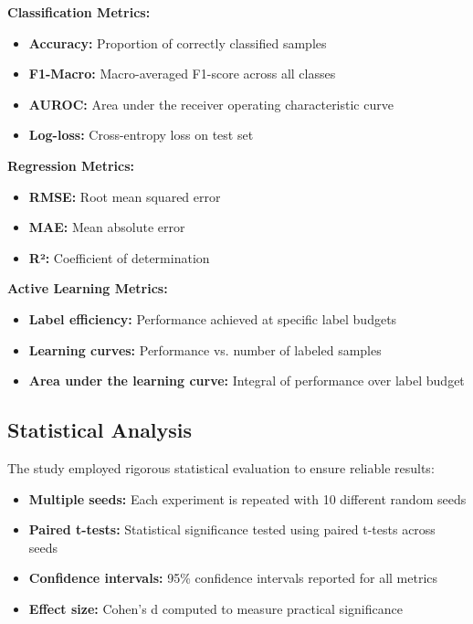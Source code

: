 \documentclass[conference]{IEEEtran}
\begin{document}
\textbf{Classification Metrics:}
\begin{itemize}
\item \textbf{Accuracy:} Proportion of correctly classified samples
\item \textbf{F1-Macro:} Macro-averaged F1-score across all classes
\item \textbf{AUROC:} Area under the receiver operating characteristic curve
\item \textbf{Log-loss:} Cross-entropy loss on test set
\end{itemize}

\textbf{Regression Metrics:}
\begin{itemize}
\item \textbf{RMSE:} Root mean squared error
\item \textbf{MAE:} Mean absolute error
\item \textbf{R²:} Coefficient of determination
\end{itemize}

\textbf{Active Learning Metrics:}
\begin{itemize}
\item \textbf{Label efficiency:} Performance achieved at specific label budgets
\item \textbf{Learning curves:} Performance vs. number of labeled samples
\item \textbf{Area under the learning curve:} Integral of performance over label budget
\end{itemize}

\subsection{Statistical Analysis}

The study employed rigorous statistical evaluation to ensure reliable results:

\begin{itemize}
\item \textbf{Multiple seeds:} Each experiment is repeated with 10 different random seeds
\item \textbf{Paired t-tests:} Statistical significance tested using paired t-tests across seeds
\item \textbf{Confidence intervals:} 95\% confidence intervals reported for all metrics
\item \textbf{Effect size:} Cohen's d computed to measure practical significance
\end{itemize}
\end{document}
